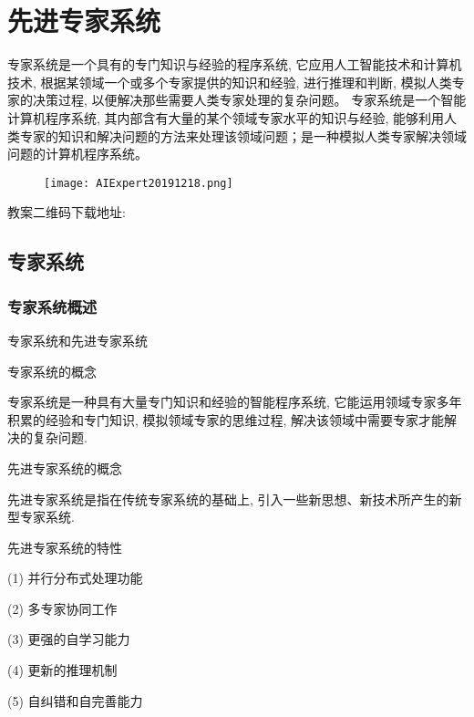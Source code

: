 \chapter{先进专家系统}\label{AIChapter10}
\begin{tcolorbox}[colback=white!50,colframe=orange!50,title=专家系统]
专家系统是一个具有的专门知识与经验的程序系统, 它应用人工智能技术和计算机技术, 根据某领域一个或多个专家提供的知识和经验, 进行推理和判断, 模拟人类专家的决策过程, 以便解决那些需要人类专家处理的复杂问题。
专家系统是一个智能计算机程序系统, 其内部含有大量的某个领域专家水平的知识与经验, 能够利用人类专家的知识和解决问题的方法来处理该领域问题；是一种模拟人类专家解决领域问题的计算机程序系统。
\end{tcolorbox}
\begin{figure}[H]
\centering
\texttt{[image: AIExpert20191218.png]}
\label{AIExpert20191218}
\end{figure}
教案二维码下载地址: 
\section{专家系统}
\subsection{专家系统概述}
专家系统和先进专家系统

专家系统的概念

    专家系统是一种具有大量专门知识和经验的智能程序系统, 它能运用领域专家多年积累的经验和专门知识, 模拟领域专家的思维过程, 解决该领域中需要专家才能解决的复杂问题.

先进专家系统的概念

    先进专家系统是指在传统专家系统的基础上, 引入一些新思想、新技术所产生的新型专家系统.

先进专家系统的特性

    (1) 并行分布式处理功能

    (2) 多专家协同工作

    (3) 更强的自学习能力

    (4) 更新的推理机制

    (5) 自纠错和自完善能力

